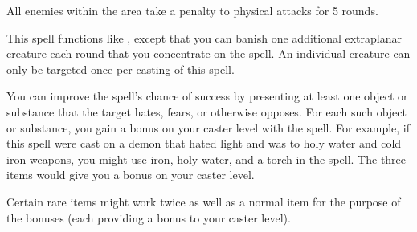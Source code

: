 \begin{comment}
\subsubsection{B}
\end{comment}

\begin{spellsuccess}
  All enemies within the area take a  penalty to physical attacks for 5 rounds.
\end{spellsuccess}

\spellrng{\rngmed}
\begin{spelleffect}
  This spell functions like , except that you can banish one additional extraplanar creature each round that you concentrate on the spell. An individual creature can only be targeted once per casting of this spell.
\end{spelleffect}
\begin{spellnotes}
  You can improve the spell's chance of success by presenting at least one object or substance that the target hates, fears, or otherwise opposes. For each such object or substance, you gain a  bonus on your caster level with the spell. For example, if this spell were cast on a demon that hated light and was \vulnerable to holy water and cold iron weapons, you might use iron, holy water, and a torch in the spell. The three items would give you a  bonus on your caster level. 
  \par Certain rare items might work twice as well as a normal item for the purpose of the bonuses (each providing a  bonus to your caster level).
\end{spellnotes}

